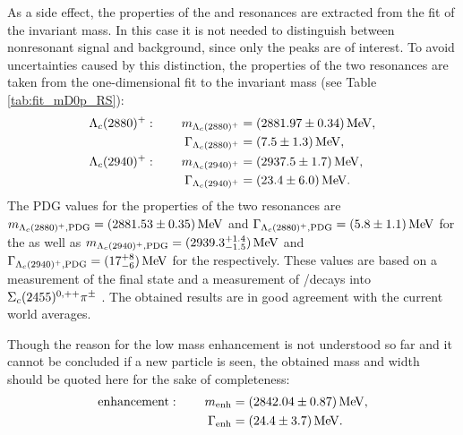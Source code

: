 As a side effect, the properties of the \LcResI and \LcResII resonances are extracted from the fit of the invariant \Dz\proton mass.
In this case it is not needed to distinguish between nonresonant signal and background, since only the peaks are of interest. 
To avoid uncertainties caused by this distinction, the properties of the two resonances are taken from the one-dimensional fit to the invariant \Dz\proton mass (see Table \ref{tab:fit_mD0p_RS}):
\begin{align*}
    {\ensuremath{\Lambda}}_{c}(2880)^+: \qquad  m_{{\Lambda}_{c}(2880)^+}       &= (2881.97 \pm 0.34) \mathrm{\,Me\kern -0.1em V}, \\
                     \Gamma_{{\Lambda}_{c}(2880)^+}  &= (7.5 \pm 1.3) \mathrm{\,Me\kern -0.1em V}, \\
    {\Lambda}_{c}(2940)^+: \qquad m_{{\Lambda}_{c}(2940)^+}      &= (2937.5 \pm 1.7) \mathrm{\,Me\kern -0.1em V}, \\
                     \Gamma_{{\Lambda}_{c}(2940)^+} &= (23.4 \pm 6.0) \mathrm{\,Me\kern -0.1em V}.
\end{align*}
The PDG values for the properties of the two resonances are $m_{{\Lambda}_{c}(2880)^+, \text{PDG}} = (2881.53 \pm 0.35)\mathrm{\,Me\kern -0.1em V}$ and $\Gamma_{{\Lambda}_{c}(2880)^+, \text{PDG}} = (5.8 \pm 1.1)\mathrm{\,Me\kern -0.1em V}$ for the \LcResI as well as $m_{{\Lambda}_{c}(2940)^+, \text{PDG}} = (2939.3^{+1.4}_{-1.5})\mathrm{\,Me\kern -0.1em V}$ and $\Gamma_{{\Lambda}_{c}(2940)^+, \text{PDG}} = (17^{+8}_{-6})\mathrm{\,Me\kern -0.1em V}$ for the \LcResII respectively.
These values are based on a \babar measurement of the \Dz\proton final state and a \belle measurement of \LcResI/\LcResII decays into $\Sigma_{c}(2455)^{0,++}{{\pi}^\pm}$ \cite{Belle_LcRes}.
The obtained results are in good agreement with the current world averages.

Though the reason for the low mass enhancement is not understood so far and it cannot be concluded if a new particle is seen, the obtained mass and width should be quoted here for the sake of completeness:
\begin{align*}
    \text{enhancement}: \qquad  m_{\text{enh}} &= (2842.04 \pm 0.87) \mathrm{\,Me\kern -0.1em V}, \\
                                \Gamma_{\text{enh}}   &= (24.4 \pm 3.7) \mathrm{\,Me\kern -0.1em V}.
\end{align*}
